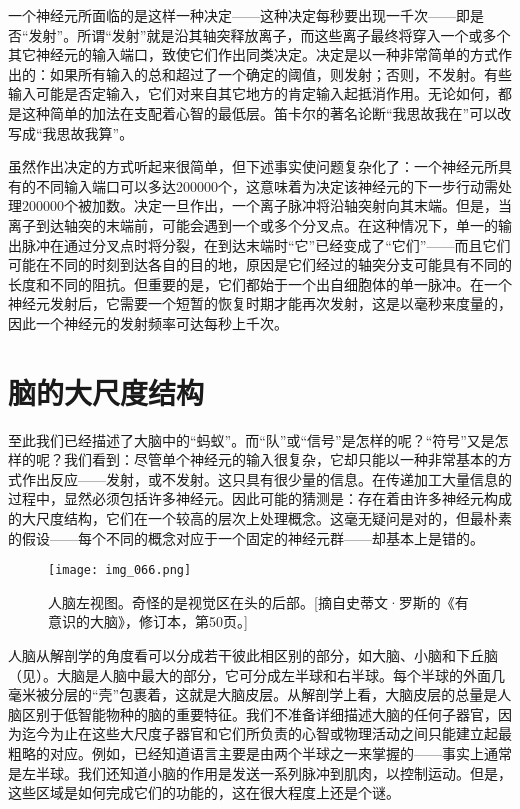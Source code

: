 一个神经元所面临的是这样一种决定——这种决定每秒要出现一千次——即是否“发射”。所谓“发射”就是沿其轴突释放离子，而这些离子最终将穿入一个或多个其它神经元的输入端口，致使它们作出同类决定。决定是以一种非常简单的方式作出的：如果所有输入的总和超过了一个确定的阈值，则发射；否则，不发射。有些输入可能是否定输入，它们对来自其它地方的肯定输入起抵消作用。无论如何，都是这种简单的加法在支配着心智的最低层。笛卡尔的著名论断“我思故我在”可以改写成“我思故我算”。

虽然作出决定的方式听起来很简单，但下述事实使问题复杂化了：一个神经元所具有的不同输入端口可以多达$200000$个，这意味着为决定该神经元的下一步行动需处理$200000$个被加数。决定一旦作出，一个离子脉冲将沿轴突射向其末端。但是，当离子到达轴突的末端前，可能会遇到一个或多个分叉点。在这种情况下，单一的输出脉冲在通过分叉点时将分裂，在到达末端时“它”已经变成了“它们”——而且它们可能在不同的时刻到达各自的目的地，原因是它们经过的轴突分支可能具有不同的长度和不同的阻抗。但重要的是，它们都始于一个出自细胞体的单一脉冲。在一个神经元发射后，它需要一个短暂的恢复时期才能再次发射，这是以毫秒来度量的，因此一个神经元的发射频率可达每秒上千次。

\section{脑的大尺度结构}

至此我们已经描述了大脑中的“蚂蚁”。而“队”或“信号”是怎样的呢？“符号”又是怎样的呢？我们看到：尽管单个神经元的输入很复杂，它却只能以一种非常基本的方式作出反应——发射，或不发射。这只具有很少量的信息。在传递加工大量信息的过程中，显然必须包括许多神经元。因此可能的猜测是：存在着由许多神经元构成的大尺度结构，它们在一个较高的层次上处理概念。这毫无疑问是对的，但最朴素的假设——每个不同的概念对应于一个固定的神经元群——却基本上是错的。

\begin{figure}
\texttt{[image: img\_066.png]}
\caption[人脑左视阁。]
  {人脑左视图。奇怪的是视觉区在头的后部。[摘自史蒂文·罗斯的《有意识的大脑》，修订本，第50页。]}
\end{figure}

人脑从解剖学的角度看可以分成若干彼此相区别的部分，如大脑、小脑和下丘脑（见）。大脑是人脑中最大的部分，它可分成左半球和右半球。每个半球的外面几毫米被分层的“壳”包裹着，这就是大脑皮层。从解剖学上看，大脑皮层的总量是人脑区别于低智能物种的脑的重要特征。我们不准备详细描述大脑的任何子器官，因为迄今为止在这些大尺度子器官和它们所负责的心智或物理活动之间只能建立起最粗略的对应。例如，已经知道语言主要是由两个半球之一来掌握的——事实上通常是左半球。我们还知道小脑的作用是发送一系列脉冲到肌肉，以控制运动。但是，这些区域是如何完成它们的功能的，这在很大程度上还是个谜。

